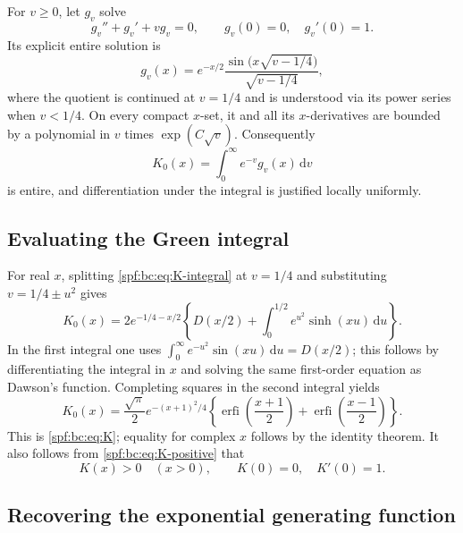 \documentclass[11pt]{article}
\numberwithin{equation}{section}
\theoremstyle{definition}
\theoremstyle{remark}
\theoremstyle{definition}
\begin{document}
For $v\ge0$, let $g_v$ solve
\begin{equation}
 g_v''+g_v'+vg_v=0,\qquad g_v(0)=0,\quad g_v'(0)=1.
 \label{spf:bc:eq:green-ode}
\end{equation}
Its explicit entire solution is
\begin{equation}
 g_v(x)=e^{-x/2}
   \frac{\sin\!\bigl(x\sqrt{v-1/4}\bigr)}{\sqrt{v-1/4}},
 \label{spf:bc:eq:green}
\end{equation}
where the quotient is continued at $v=1/4$ and is understood via its power
series when $v<1/4$. On every compact $x$-set, it and all its $x$-derivatives
are bounded by a polynomial in $v$ times $\exp(C\sqrt v)$. Consequently
\begin{equation}
 K_0(x)=\int_0^\infty e^{-v}g_v(x)\,\mathrm d v
 \label{spf:bc:eq:K-integral}
\end{equation}
is entire, and differentiation under the integral is justified locally
uniformly.

\subsection{Evaluating the Green integral}

For real $x$, splitting \eqref{spf:bc:eq:K-integral} at $v=1/4$ and substituting
$v=1/4\pm u^2$ gives
\begin{equation}
 K_0(x)=2e^{-1/4-x/2}
 \left\{D(x/2)+\int_0^{1/2}e^{u^2}\sinh(xu)\,\mathrm d u\right\}.
 \label{spf:bc:eq:K-positive}
\end{equation}
In the first integral one uses
$\int_0^\infty e^{-u^2}\sin(xu)\,\mathrm d u=D(x/2)$; this follows by differentiating
the integral in $x$ and solving the same first-order equation as Dawson's
function. Completing squares in the second integral yields
\begin{equation}
 K_0(x)=\frac{\sqrt\pi}{2}e^{-(x+1)^2/4}
 \left\{\operatorname{erfi}\!\left(\frac{x+1}{2}\right)
       +\operatorname{erfi}\!\left(\frac{x-1}{2}\right)\right\}.
 \label{spf:bc:eq:K-erfi}
\end{equation}
This is \eqref{spf:bc:eq:K}; equality for complex $x$ follows by the identity theorem.
It also follows from \eqref{spf:bc:eq:K-positive} that
\begin{equation}
 K(x)>0\quad(x>0),\qquad K(0)=0,\quad K'(0)=1.
 \label{spf:bc:eq:K-positive-values}
\end{equation}

\subsection{Recovering the exponential generating function}
\end{document}
